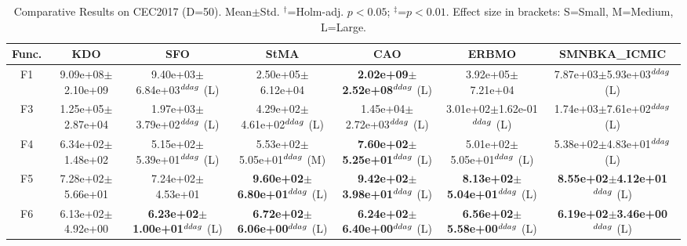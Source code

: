 \begin{table}[!t]
\centering\small
\caption{Comparative Results on CEC2017 (D=50). Mean$\pm$Std. $^{\dag}$=Holm-adj. $p<0.05$; $^{\ddag}$=$p<0.01$. Effect size in brackets: S=Small, M=Medium, L=Large.}
\label{tab:enhanced}
\begin{tabular}{c|cccccc}
\hline
Func. & \textbf{KDO} & SFO & StMA & CAO & ERBMO & SMNBKA_ICMIC \\ \hline\hline
F1  & 9.09e+08$\pm$2.10e+09  & 9.40e+03$\pm$6.84e+03$^{\\ddag}$ (L)  & 2.50e+05$\pm$6.12e+04   & \textbf{2.02e+09$\pm$2.52e+08}$^{\\ddag}$ (L)  & 3.92e+05$\pm$7.21e+04   & 7.87e+03$\pm$5.93e+03$^{\\ddag}$ (L) \\ \hline
F3  & 1.25e+05$\pm$2.87e+04  & 1.97e+03$\pm$3.79e+02$^{\\ddag}$ (L)  & 4.29e+02$\pm$4.61e+02$^{\\ddag}$ (L)  & 1.45e+04$\pm$2.72e+03$^{\\ddag}$ (L)  & 3.01e+02$\pm$1.62e-01$^{\\ddag}$ (L)  & 1.74e+03$\pm$7.61e+02$^{\\ddag}$ (L) \\ \hline
F4  & 6.34e+02$\pm$1.48e+02  & 5.15e+02$\pm$5.39e+01$^{\\ddag}$ (L)  & 5.53e+02$\pm$5.05e+01$^{\\ddag}$ (M)  & \textbf{7.60e+02$\pm$5.25e+01}$^{\\ddag}$ (L)  & 5.01e+02$\pm$5.05e+01$^{\\ddag}$ (L)  & 5.38e+02$\pm$4.83e+01$^{\\ddag}$ (L) \\ \hline
F5  & 7.28e+02$\pm$5.66e+01  & 7.24e+02$\pm$4.53e+01   & \textbf{9.60e+02$\pm$6.80e+01}$^{\\ddag}$ (L)  & \textbf{9.42e+02$\pm$3.98e+01}$^{\\ddag}$ (L)  & \textbf{8.13e+02$\pm$5.04e+01}$^{\\ddag}$ (L)  & \textbf{8.55e+02$\pm$4.12e+01}$^{\\ddag}$ (L) \\ \hline
F6  & 6.13e+02$\pm$4.92e+00  & \textbf{6.23e+02$\pm$1.00e+01}$^{\\ddag}$ (L)  & \textbf{6.72e+02$\pm$6.06e+00}$^{\\ddag}$ (L)  & \textbf{6.24e+02$\pm$6.40e+00}$^{\\ddag}$ (L)  & \textbf{6.56e+02$\pm$5.58e+00}$^{\\ddag}$ (L)  & \textbf{6.19e+02$\pm$3.46e+00}$^{\\ddag}$ (L) \\ \hline

\end{tabular}
\end{table}
